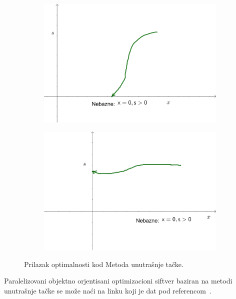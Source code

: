 \documentclass[a4paper, utf8, 11pt, colorlinks]{book}
\theoremstyle{definition}
\begin{document}
\begin{figure}
	\centering
	\begin{subfigure}{.45\textwidth}
	\centering
	\includegraphics[width=.9\linewidth]{interior-3}  
\end{subfigure}
\begin{subfigure}{.45\textwidth}
	\centering
	\includegraphics[width=.9\linewidth]{interior-4}  
\end{subfigure}
  \caption{Prilazak optimalnosti kod Metoda unutrašnje tačke.}
   \label{fig:optimality-approaching-interior}
\end{figure}
Paralelizovani objektno orjentisani optimizacioni siftver baziran na metodi unutrašnje tačke se može naći na 
linku koji je dat pod referencom~\cite{cite_key25}. %
\end{document}
